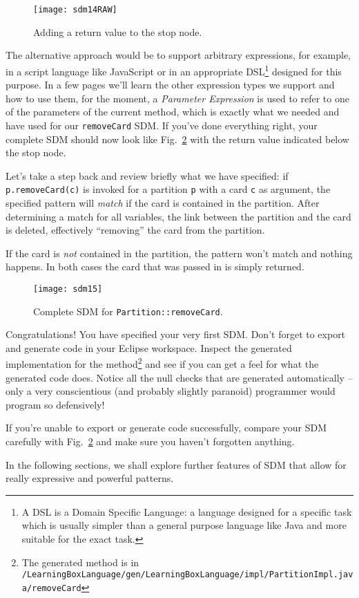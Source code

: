 \begin{figure}[htp]
\begin{center}
  \texttt{[image: sdm14RAW]}
  \caption{Adding a return value to the stop node.}  
  \label{fig:stop_node_return_value}
\end{center}
\end{figure}

The alternative approach would be to support arbitrary expressions, for example, in a script language like JavaScript or in an appropriate DSL\footnote{A DSL is
a Domain Specific Language: a language designed for a specific task which is usually simpler than a general purpose language like Java and more suitable for the
exact task.} designed for this purpose. In a few pages we'll learn the other expression types  we support and how to use them, for
the moment, a \emph{Parameter Expression} is used to refer to one of the parameters of the current method, which is exactly what we needed and have used for our
\texttt{removeCard} SDM. If you've done everything right, your complete SDM should now look like Fig.~\ref{fig:sdm_complete_control_flow} with the return value
indicated below the stop node.

Let's take a step back and review briefly what we have specified:  if \texttt{p.remove\-Card(c)} is invoked for a partition \texttt{p} with a card \texttt{c} as
argument, the specified pattern will \emph{match} if the card is contained in the partition. After determining a match for all variables, the link between the
partition and the card is deleted, effectively ``removing'' the card from the partition.

If the card is \emph{not} contained in the partition, the pattern won't match and nothing happens. In both cases the card that was passed in is simply returned.

\begin{figure}[htbp]
\begin{center}
  \texttt{[image: sdm15]}
  \caption{Complete SDM for \texttt{Partition::removeCard}.}  
  \label{fig:sdm_complete_control_flow}
\end{center}
\end{figure}

Congratulations!  You have specified your very first SDM.
Don't forget to export and generate code in your Eclipse workspace.
Inspect the generated implementation for the method\footnote{The generated method is in
\texttt{/Learning\-Box\-Language/\-gen/\-Learning\-Box\-Language/\-impl/\-Partition\-Impl.java/\-remove\-Card}} and see if you can get a feel for what the
generated code does.
Notice all the null checks that are generated automatically -- only a very conscientious (and probably slightly paranoid) programmer would program so
defensively!

If you're unable to export or generate code successfully, compare your SDM carefully with Fig.~\ref{fig:sdm_complete_control_flow} and make sure you haven't
forgotten anything.

In the following sections, we shall explore further features of SDM that allow for really expressive and powerful patterns.
